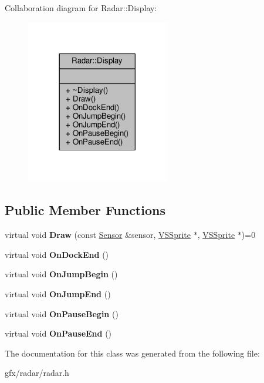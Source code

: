 Collaboration diagram for Radar\+:\+:Display\+:
\nopagebreak
\begin{figure}[H]
\begin{center}
\leavevmode
\includegraphics[width=177pt]{d4/d5c/classRadar_1_1Display__coll__graph}
\end{center}
\end{figure}
\subsection*{Public Member Functions}
\begin{DoxyCompactItemize}
\item 
virtual void {\bfseries Draw} (const \hyperlink{classRadar_1_1Sensor}{Sensor} \&sensor, \hyperlink{classVSSprite}{V\+S\+Sprite} $\ast$, \hyperlink{classVSSprite}{V\+S\+Sprite} $\ast$)=0\hypertarget{classRadar_1_1Display_aec74798c00b4b8c9994b1261e2d253a4}{}\label{classRadar_1_1Display_aec74798c00b4b8c9994b1261e2d253a4}

\item 
virtual void {\bfseries On\+Dock\+End} ()\hypertarget{classRadar_1_1Display_a41e632f18df1a43e538bb95ffb120f62}{}\label{classRadar_1_1Display_a41e632f18df1a43e538bb95ffb120f62}

\item 
virtual void {\bfseries On\+Jump\+Begin} ()\hypertarget{classRadar_1_1Display_a5ba78eb8d80f7b4f56eb6ac1e2820cf9}{}\label{classRadar_1_1Display_a5ba78eb8d80f7b4f56eb6ac1e2820cf9}

\item 
virtual void {\bfseries On\+Jump\+End} ()\hypertarget{classRadar_1_1Display_acee0955352ade5a675316f232e422f9f}{}\label{classRadar_1_1Display_acee0955352ade5a675316f232e422f9f}

\item 
virtual void {\bfseries On\+Pause\+Begin} ()\hypertarget{classRadar_1_1Display_ae4e6f0ac6ca9600bb8b993d486a8ef33}{}\label{classRadar_1_1Display_ae4e6f0ac6ca9600bb8b993d486a8ef33}

\item 
virtual void {\bfseries On\+Pause\+End} ()\hypertarget{classRadar_1_1Display_afa605f0e91a9cf61a3912ac8f7cc4362}{}\label{classRadar_1_1Display_afa605f0e91a9cf61a3912ac8f7cc4362}

\end{DoxyCompactItemize}


The documentation for this class was generated from the following file\+:\begin{DoxyCompactItemize}
\item 
gfx/radar/radar.\+h\end{DoxyCompactItemize}
